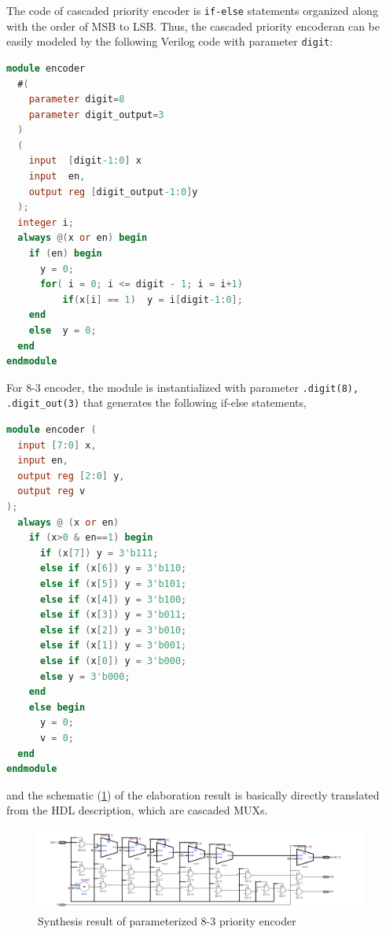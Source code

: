 \documentclass[journal, onecolumn]{IEEEtran}
\begin{document}
The code of cascaded priority encoder is \lstinline{if-else} statements organized along with the order of MSB to LSB. Thus, the cascaded priority encoderan can be easily modeled by the following Verilog code with parameter \lstinline{digit}:

\begin{lstlisting}[language=verilog, style=verilog]
module encoder
  #(
    parameter digit=8
    parameter digit_output=3
  )
  (
    input  [digit-1:0] x
    input  en,
    output reg [digit_output-1:0]y
  );
  integer i;
  always @(x or en) begin
    if (en) begin
      y = 0;
      for( i = 0; i <= digit - 1; i = i+1)
          if(x[i] == 1)  y = i[digit-1:0];
    end
    else  y = 0;
  end
endmodule
\end{lstlisting}

For 8-3 encoder, the module is instantialized with parameter \lstinline{.digit(8), .digit_out(3)} that generates the following if-else statements,

\begin{lstlisting}[language=verilog,style=verilog]
module encoder (
  input [7:0] x,
  input en,
  output reg [2:0] y,
  output reg v
);
  always @ (x or en)
    if (x>0 & en==1) begin
      if (x[7]) y = 3'b111;
      else if (x[6]) y = 3'b110;
      else if (x[5]) y = 3'b101;
      else if (x[4]) y = 3'b100;
      else if (x[3]) y = 3'b011;
      else if (x[2]) y = 3'b010;
      else if (x[1]) y = 3'b001;
      else if (x[0]) y = 3'b000;
      else y = 3'b000;
    end
    else begin
      y = 0;
      v = 0;
  end
endmodule
\end{lstlisting}

and the schematic (\ref{cascaded_83_encoder}) of the elaboration result is basically directly translated from the HDL description, which are cascaded MUXs.

\begin{figure}[htpb]
	\begin{center}
		\includegraphics[width=0.98\textwidth]{report_lab3.assets/20240321191356.png}
		\caption{Synthesis result of parameterized 8-3 priority encoder}
		\label{cascaded_83_encoder}
	\end{center}
\end{figure}
\end{document}

